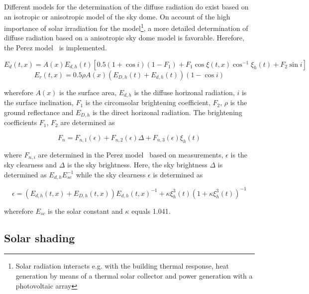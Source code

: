 \documentclass{book}
\begin{document}
Different models for the determination of the diffuse radiation do exist based on an isotropic or anisotropic model of the sky dome. On account of the high importance of solar irradiation for the model\footnote{Solar radiation interacts e.g. with the building thermal response, heat generation by means of a thermal solar collector and power generation with a photovoltaic array}, a more detailed determination of diffuse radiation based on a anisotropic sky dome model is favorable. Herefore, the Perez model~\cite{Perez1986,Perez1987} is implemented.

\begin{dmath}
E_{d}(t,x) =  A(x) E_{d,h}(t) \left[ 0.5 \left(1+\cos i\right) \left(1-F_{1}\right) + F_{1} \cos\xi(t,x) \cos^{-1}\xi_{h}(t) + F_{2} \sin i\right]
\end{dmath}
\begin{dmath}
E_{r}(t,x) = 0.5 \rho A(x) \left(E_{D,h}(t) + E_{d,h}(t)\right) \left(1 - \cos i\right)
\end{dmath}

wherefore $A(x)$ is the surface area, $E_{d,h}$ is the diffuse horizonal radiation, $i$ is the surface inclination, $F_{1}$ is the circomsolar brightening coefficient, $F_{2}$, $\rho$ is the ground reflectance and $E_{D,h}$ is the direct horizonal radiation. The brightening coefficients $F_{1}$, $F_{2}$ are determined as

\begin{dmath}
F_{n} = F_{n,1}(\epsilon) + F_{n,2}(\epsilon) \Delta + F_{n,3}(\epsilon) \xi_{h}(t)
\end{dmath}

where $F_{n,i}$ are determined in the Perez model~\cite{Perez1987} based on measurements, $\epsilon$ is the sky clearness and $\Delta$ is the sky brightness. Here, the sky brightness $\Delta$ is determined as $E_{d,h} E_{sc}^{-1}$ while the sky clearness $\epsilon$ is determined as

\begin{dmath}
\epsilon = \left(E_{d,h}(t,x) + E_{D,h}(t,x)\right) E_{d,h}(t,x)^{-1} + \kappa \xi_{h}^{3}(t) \left(1 + \kappa \xi_{h}^{3}(t)\right)^{-1}
\end{dmath}

wherefore $E_{sc}$ is the solar constant and $\kappa$ equals 1.041.

\subsection{Solar shading}
\end{document}
